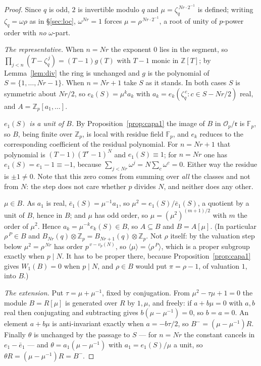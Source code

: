 \documentclass[11pt,a4paper]{article}
\theoremstyle{definition}
\newcommand{\ZZ}{\mathbb{Z}}
\newcommand{\FF}{\mathbb{F}}
\newcommand{\cO}{\mathcal{O}}
\newcommand{\rad}{\mathfrak{r}}
\begin{document}
\begin{proof}
Since $q$ is odd, $2$ is invertible modulo $q$ and $\mu=\zeta_q^{\,Nr\cdot2^{-1}}$ is defined;
writing $\zeta_q=\omega\rho$ as in \S\ref{sec:loc}, $\omega^{Nr}=1$ forces
$\mu=\rho^{\,Nr\cdot2^{-1}}$, a root of unity of $p$-power order with \emph{no} $\omega$-part.

\emph{The representative.} When $n=Nr$ the exponent $0$ lies in the segment, so
$\prod_{j<n}(T-\zeta_q^{\,j})=(T-1)g(T)$ with $T-1$ monic in $\ZZ[T]$; by Lemma~\ref{lem:div} the
ring is unchanged and $g$ is the polynomial of $S=\{1,\dots,Nr-1\}$. When $n=Nr+1$ take $S$ as it
stands. In both cases $S$ is symmetric about $Nr/2$, so $e_k(S)=\mu^k a_k$ with
$a_k=e_k(\zeta_q^{\,c}:c\in S-Nr/2)$ real, and $A=\ZZ_p[a_1,\dots]$.

\emph{$e_1(S)$ is a unit of $B$.} By Proposition~\ref{prop:capa1} the image of $B$ in
$\cO_p/\rad$ is $\FF_p$, so $B$, being finite over $\ZZ_p$, is local with residue field $\FF_p$,
and $e_k$ reduces to the corresponding coefficient of the residual polynomial. For
$n=Nr+1$ that polynomial is $(T-1)(T^r-1)^N$ and $e_1(S)\equiv1$; for $n=Nr$ one has
$e_1(S)=e_1-1\equiv-1$, because $\sum_{j<Nr}\omega^j=N\sum_{c}\omega^c=0$. Either way the residue
is $\pm1\neq0$. Note that this zero comes from summing over \emph{all} the classes and not from
$N$: the step does not care whether $p$ divides $N$, and neither does any other.

\emph{$\mu\in B$.} As $a_1$ is real, $\bar e_1(S)=\mu^{-1}a_1$, so $\mu^2=e_1(S)/\bar e_1(S)$, a
quotient by a unit of $B$, hence in $B$; and $\mu$ has odd order, so
$\mu=(\mu^2)^{(m+1)/2}$ with $m$ the order of $\mu^2$. Hence $a_k=\mu^{-k}e_k(S)\in B$, so
$A\subseteq B$ and $B=A[\mu]$. (In particular $\rho^{\,P}\in B$ and
$B_{Nr}(q)\otimes\ZZ_p=B_{Nr+1}(q)\otimes\ZZ_p$. Not $\rho$ itself: by the valuation step below
$\mu^2=\rho^{\,Nr}$ has order $p^{\,v-v_p(N)}$, so $\langle\mu\rangle=\langle\rho^{\,P}\rangle$,
which is a proper subgroup exactly when $p\mid N$. It has to be proper there, because
Proposition~\ref{prop:capa1} gives $W_1(B)=0$ when $p\mid N$, and $\rho\in B$ would put
$\pi=\rho-1$, of valuation $1$, into $B$.)

\emph{The extension.} Put $\tau=\mu+\mu^{-1}$, fixed by conjugation. From $\mu^2-\tau\mu+1=0$ the
module $B=R[\mu]$ is generated over $R$ by $1,\mu$, and freely: if $a+b\mu=0$ with $a,b$ real then
conjugating and subtracting gives $b(\mu-\mu^{-1})=0$, so $b=a=0$. An element $a+b\mu$ is
anti-invariant exactly when $a=-b\tau/2$, so $B^-=(\mu-\mu^{-1})R$. Finally $\theta$ is unchanged
by the passage to $S$ --- for $n=Nr$ the constant cancels in $e_1-\bar e_1$ --- and
$\theta=a_1(\mu-\mu^{-1})$ with $a_1=e_1(S)/\mu$ a unit, so $\theta R=(\mu-\mu^{-1})R=B^-$.


\end{proof}
\end{document}
